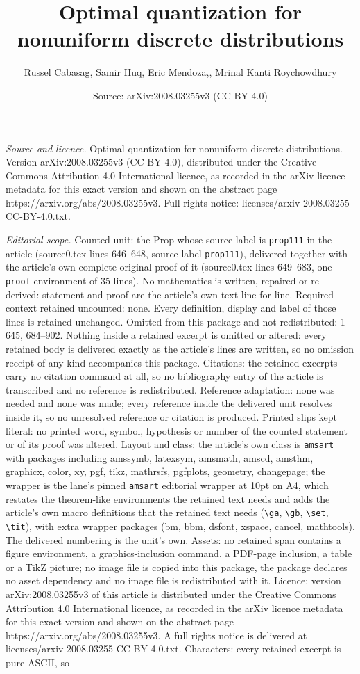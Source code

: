 \documentclass[10pt,a4paper]{amsart}
\title[Optimal quantization for nonuniform discrete distributions]{Optimal quantization for nonuniform discrete distributions}
\author{Russel Cabasag, Samir Huq, Eric Mendoza,, Mrinal Kanti Roychowdhury}
\date{Source: arXiv:2008.03255v3 (CC BY 4.0)}
\begin{document}
\maketitle

\noindent\emph{Source and licence.} Optimal quantization for nonuniform discrete distributions. Version arXiv:2008.03255v3 (CC BY 4.0), distributed under the Creative Commons Attribution 4.0 International licence, as recorded in the arXiv licence metadata for this exact version and shown on the abstract page https://arxiv.org/abs/2008.03255v3. Full rights notice: licenses/arxiv-2008.03255-CC-BY-4.0.txt.\par\smallskip

\noindent\textit{Editorial scope.} Counted unit: the Prop whose source label is \texttt{prop111} in the article (source0.tex lines 646--648, source label \texttt{prop111}), delivered together with the article's own complete original proof of it (source0.tex lines 649--683, one \texttt{proof} environment of 35 lines). No mathematics is written, repaired or re-derived: statement and proof are the article's own text line for line. Required context retained uncounted: none. Every definition, display and label of those lines is retained unchanged. Omitted from this package and not redistributed: 1--645, 684--902. Nothing inside a retained excerpt is omitted or altered: every retained body is delivered exactly as the article's lines are written, so no omission receipt of any kind accompanies this package. Citations: the retained excerpts carry no citation command at all, so no bibliography entry of the article is transcribed and no reference is redistributed. Reference adaptation: none was needed and none was made; every reference inside the delivered unit resolves inside it, so no unresolved reference or citation is produced. Printed slips kept literal: no printed word, symbol, hypothesis or number of the counted statement or of its proof was altered. Layout and class: the article's own class is \texttt{amsart} with packages including amssymb, latexsym, amsmath, amscd, amsthm, graphicx, color, xy, pgf, tikz, mathrsfs, pgfplots, geometry, changepage; the wrapper is the lane's pinned \texttt{amsart} editorial wrapper at 10pt on A4, which restates the theorem-like environments the retained text needs and adds the article's own macro definitions that the retained text needs (\texttt{\textbackslash ga}, \texttt{\textbackslash gb}, \texttt{\textbackslash set}, \texttt{\textbackslash tit}), with extra wrapper packages (bm, bbm, dsfont, xspace, cancel, mathtools). The delivered numbering is the unit's own. Assets: no retained span contains a figure environment, a graphics-inclusion command, a PDF-page inclusion, a table or a TikZ picture; no image file is copied into this package, the package declares no asset dependency and no image file is redistributed with it. Licence: version arXiv:2008.03255v3 of this article is distributed under the Creative Commons Attribution 4.0 International licence, as recorded in the arXiv licence metadata for this exact version and shown on the abstract page https://arxiv.org/abs/2008.03255v3. A full rights notice is delivered at licenses/arxiv-2008.03255-CC-BY-4.0.txt. Characters: every retained excerpt is pure ASCII, so 
\end{document}
